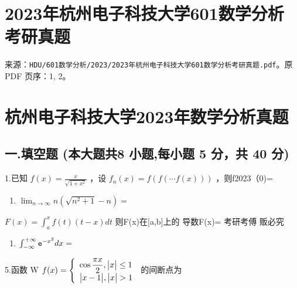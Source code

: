 \documentclass[11pt,fontset=fandol]{ctexart}
\providecommand{\tightlist}{\setlength{\itemsep}{0pt}\setlength{\parskip}{0pt}}
\begin{document}
\section{2023年杭州电子科技大学601数学分析考研真题}\label{ux5e74ux676dux5ddeux7535ux5b50ux79d1ux6280ux5927ux5b66601ux6570ux5b66ux5206ux6790ux8003ux7814ux771fux9898}

来源：\texttt{HDU/601数学分析/2023/2023年杭州电子科技大学601数学分析考研真题.pdf}。原
PDF 页序：1, 2。

\section{杭州电子科技大学2023年数学分析真题}\label{ux676dux5ddeux7535ux5b50ux79d1ux6280ux5927ux5b662023ux5e74ux6570ux5b66ux5206ux6790ux771fux9898}

\subsection{一.填空题 (本大题共8 小题,每小题 5 分，共 40
分)}\label{ux4e00.ux586bux7a7aux9898-ux672cux5927ux9898ux51718-ux5c0fux9898ux6bcfux5c0fux9898-5-ux5206ux5171-40-ux5206}

1.已知 \(f ( x ) = { \frac { x } { \sqrt { 1 + x ^ { 2 } } } }\) ，设
\(f _ { n } ( x ) = f ( f ( \cdots f ( x ) ) )\) ，则f2023（0)=

\begin{enumerate}
\def\labelenumi{\arabic{enumi}.}
\setcounter{enumi}{1}
\tightlist
\item
  \(\lim _ { n \to \infty } n ( { \sqrt { n ^ { 2 } + 1 } } - n ) =\)
\end{enumerate}

\(F ( x ) = \int _ { a } ^ { x } f ( t ) ( t - x ) d t\)
则F(x)在{[}a,b{]}上的 导数F(x)= 考研考傅 贩必究

\begin{enumerate}
\def\labelenumi{\arabic{enumi}.}
\setcounter{enumi}{3}
\tightlist
\item
  \(\int _ { - \infty } ^ { + \infty } { \tt e } ^ { - x ^ { 2 } } d x =\)
\end{enumerate}

5.函数 W
\(f ( x ) = \left\{ \begin{array} { l l } { \displaystyle \cos \frac { \pi x } { 2 } , \big | x \big | \leq 1 } \\ { \big | x - 1 \big | , \big | x \big | > 1 } \end{array} \right.\)
的间断点为
\end{document}
